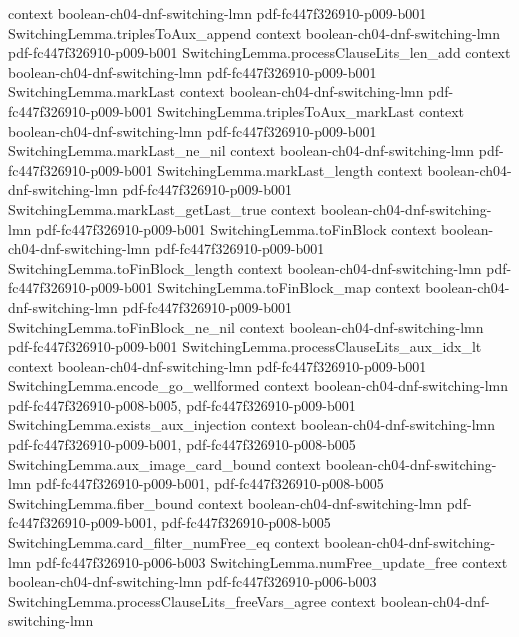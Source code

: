 \begin{theorem}
  {context}
  {boolean-ch04-dnf-switching-lmn}
  {pdf-fc447f326910-p009-b001}
\proofstep
  {SwitchingLemma.triplesToAux_append}
  {context}
  {boolean-ch04-dnf-switching-lmn}
  {pdf-fc447f326910-p009-b001}
\proofstep
  {SwitchingLemma.processClauseLits_len_add}
  {context}
  {boolean-ch04-dnf-switching-lmn}
  {pdf-fc447f326910-p009-b001}
\proofstep
  {SwitchingLemma.markLast}
  {context}
  {boolean-ch04-dnf-switching-lmn}
  {pdf-fc447f326910-p009-b001}
\proofstep
  {SwitchingLemma.triplesToAux_markLast}
  {context}
  {boolean-ch04-dnf-switching-lmn}
  {pdf-fc447f326910-p009-b001}
\proofstep
  {SwitchingLemma.markLast_ne_nil}
  {context}
  {boolean-ch04-dnf-switching-lmn}
  {pdf-fc447f326910-p009-b001}
\proofstep
  {SwitchingLemma.markLast_length}
  {context}
  {boolean-ch04-dnf-switching-lmn}
  {pdf-fc447f326910-p009-b001}
\proofstep
  {SwitchingLemma.markLast_getLast_true}
  {context}
  {boolean-ch04-dnf-switching-lmn}
  {pdf-fc447f326910-p009-b001}
\proofstep
  {SwitchingLemma.toFinBlock}
  {context}
  {boolean-ch04-dnf-switching-lmn}
  {pdf-fc447f326910-p009-b001}
\proofstep
  {SwitchingLemma.toFinBlock_length}
  {context}
  {boolean-ch04-dnf-switching-lmn}
  {pdf-fc447f326910-p009-b001}
\proofstep
  {SwitchingLemma.toFinBlock_map}
  {context}
  {boolean-ch04-dnf-switching-lmn}
  {pdf-fc447f326910-p009-b001}
\proofstep
  {SwitchingLemma.toFinBlock_ne_nil}
  {context}
  {boolean-ch04-dnf-switching-lmn}
  {pdf-fc447f326910-p009-b001}
\proofstep
  {SwitchingLemma.processClauseLits_aux_idx_lt}
  {context}
  {boolean-ch04-dnf-switching-lmn}
  {pdf-fc447f326910-p009-b001}
\proofstep
  {SwitchingLemma.encode_go_wellformed}
  {context}
  {boolean-ch04-dnf-switching-lmn}
  {pdf-fc447f326910-p008-b005,
    pdf-fc447f326910-p009-b001}
\proofstep
  {SwitchingLemma.exists_aux_injection}
  {context}
  {boolean-ch04-dnf-switching-lmn}
  {pdf-fc447f326910-p009-b001,
    pdf-fc447f326910-p008-b005}
\proofstep
  {SwitchingLemma.aux_image_card_bound}
  {context}
  {boolean-ch04-dnf-switching-lmn}
  {pdf-fc447f326910-p009-b001,
    pdf-fc447f326910-p008-b005}
\proofstep
  {SwitchingLemma.fiber_bound}
  {context}
  {boolean-ch04-dnf-switching-lmn}
  {pdf-fc447f326910-p009-b001,
    pdf-fc447f326910-p008-b005}
\proofstep
  {SwitchingLemma.card_filter_numFree_eq}
  {context}
  {boolean-ch04-dnf-switching-lmn}
  {pdf-fc447f326910-p006-b003}
\proofstep
  {SwitchingLemma.numFree_update_free}
  {context}
  {boolean-ch04-dnf-switching-lmn}
  {pdf-fc447f326910-p006-b003}
\proofstep
  {SwitchingLemma.processClauseLits_freeVars_agree}
  {context}
  {boolean-ch04-dnf-switching-lmn}

\end{theorem}
